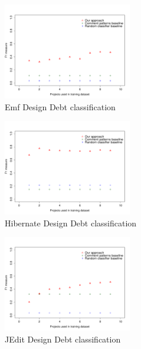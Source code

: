 \begin{figure}[thb!]
  \centering
  \includegraphics[width=0.50\textwidth]{figures/appendix/iteration_details/design_emf.pdf}
  \vspace{-3mm}
  \caption{Emf Design Debt classification}
  \label{fig:design_emf}
\end{figure}

\clearpage

\begin{figure}[thb!]
  \centering
  \includegraphics[width=0.50\textwidth]{figures/appendix/iteration_details/design_hibernate.pdf}
  \caption{Hibernate Design Debt classification}
  \label{fig:design_hibernate}
\end{figure}

\begin{figure}[thb!]
  \centering
  \includegraphics[width=0.50\textwidth]{figures/appendix/iteration_details/design_jedit.pdf}
  \vspace{-3mm}
  \caption{JEdit Design Debt classification}
  \label{fig:design_jedit}
\end{figure}

